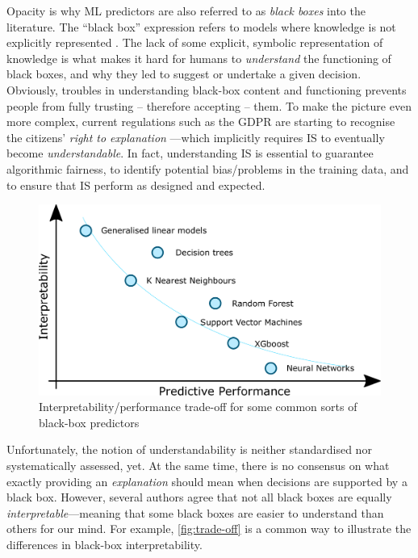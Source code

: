 \documentclass[12pt,a4paper,openright,twoside]{book}
\begin{document}
Opacity is why ML predictors are also referred to as \emph{black boxes} into the literature.
%
The ``black box'' expression refers to models where knowledge is not explicitly represented \cite{Lipton18}.
%
The lack of some explicit, symbolic representation of knowledge is what makes it hard for humans to \emph{understand} the functioning of black boxes, and why they led to suggest or undertake a given decision.
%
Obviously, troubles in understanding black-box content and functioning prevents people from fully trusting -- therefore accepting -- them.
%
To make the picture even more complex, current regulations such as the GDPR \cite{gdpr-voigt2017} are starting to recognise the citizens' \emph{right to explanation} \cite{explanation-aimag38}---which implicitly requires IS to eventually become \emph{understandable}.
%
In fact, understanding IS is essential to guarantee algorithmic fairness, to identify potential bias/problems in the training data, and to ensure that IS perform as designed and expected.

\begin{figure}
    \centering
    \includegraphics[width=\linewidth]{figures/interpretability-performance-tradeoff}
    \caption[Interpretability/performance trade-off]{Interpretability/performance trade-off for some common sorts of black-box predictors}
    \label{fig:tradeoff}
\end{figure}

Unfortunately, the notion of understandability is neither standardised nor systematically assessed, yet.
%
At the same time, there is no consensus on what exactly providing an \emph{explanation} should mean when decisions are supported by a black box.
%
However, several authors agree that not all black boxes are equally \emph{interpretable}---meaning that some black boxes are easier to understand than others for our mind.
%
For example, \cref{fig:trade-off} is a common way to illustrate the differences in black-box interpretability.
\end{document}
